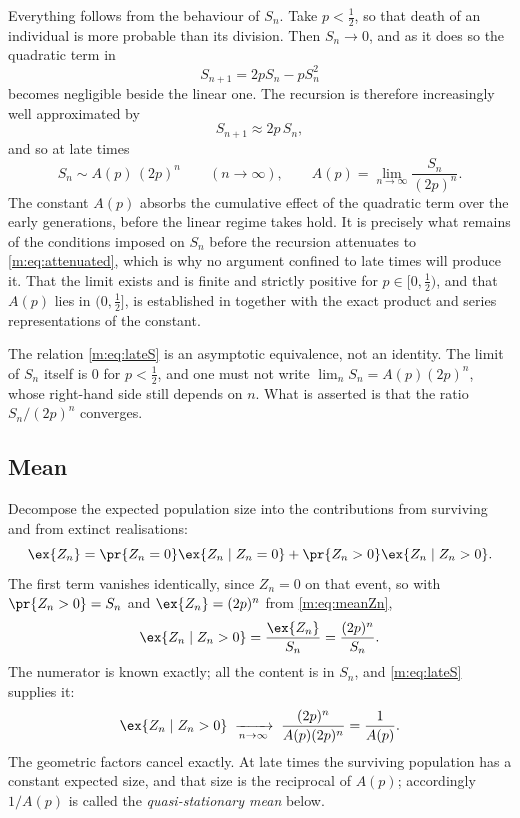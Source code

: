 Everything follows from the behaviour of $S_n$. Take $p<\tfrac12$, so that death of
an individual is more probable than its division. Then $S_n\to0$, and as it does so
the quadratic term in
\begin{equation*}
S_{n+1} = 2pS_n - pS_n^2
\end{equation*}
becomes negligible beside the linear one. The recursion is therefore increasingly
well approximated by
\begin{equation}
\label{m:eq:attenuated}
S_{n+1}\approx 2p\,S_n ,
\end{equation}
and so at late times
\begin{equation}
\label{m:eq:lateS}
S_n \sim A(p)\,(2p)^n\qquad(n\to\infty),
\qquad
A(p) = \lim_{n\to\infty}\frac{S_n}{(2p)^n} .
\end{equation}
The constant $A(p)$ absorbs the cumulative effect of the quadratic term over the
early generations, before the linear regime takes hold. It is precisely what
remains of the conditions imposed on $S_n$ before the recursion attenuates to
\cref{m:eq:attenuated}, which is why no argument confined to late times will produce
it. That the limit exists and is finite and strictly positive for
$p\in[0,\tfrac12)$, and that $A(p)$ lies in $(0,\tfrac12]$, is established in \ChA{}
together with the exact product and series representations of the constant.

\begin{remark}
\label{m:rem:asympnotidentity}
The relation \cref{m:eq:lateS} is an asymptotic equivalence, not an identity. The
limit of $S_n$ itself is $0$ for $p<\tfrac12$, and one must not write
$\lim_n S_n = A(p)(2p)^n$, whose right-hand side still depends on $n$. What is
asserted is that the ratio $S_n/(2p)^n$ converges.
\end{remark}

\subsection{Mean}
\label{m:sec:condmean}

Decompose the expected population size into the contributions from surviving and
from extinct realisations:
\begin{equation*}
\ex{Z_n} = \pr{Z_n=0}\ex{Z_n\mid Z_n=0} + \pr{Z_n>0}\ex{Z_n\mid Z_n>0} .
\end{equation*}
The first term vanishes identically, since $Z_n=0$ on that event, so with
$\pr{Z_n>0}=S_n$ and $\ex{Z_n}=(2p)^n$ from \cref{m:eq:meanZn},
\begin{equation}
\label{m:eq:condmeandef}
\ex{Z_n\mid Z_n>0} = \frac{\ex{Z_n}}{S_n} = \frac{(2p)^n}{S_n} .
\end{equation}
The numerator is known exactly; all the content is in $S_n$, and \cref{m:eq:lateS}
supplies it:
\begin{equation}
\label{m:eq:qsmean}
\ex{Z_n\mid Z_n>0} \;\xrightarrow[n\to\infty]{}\;
\frac{(2p)^n}{A(p)(2p)^n} = \frac{1}{A(p)} .
\end{equation}
The geometric factors cancel exactly. At late times the surviving population has a
constant expected size, and that size is the reciprocal of $A(p)$; accordingly
$1/A(p)$ is called the \emph{quasi-stationary mean} below.

